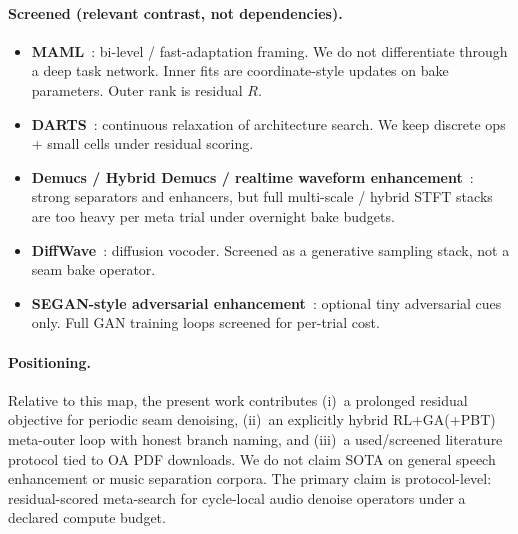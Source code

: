 \paragraph{Screened (relevant contrast, not dependencies).}
\begin{itemize}
  \item \textbf{MAML}~\cite{finn2017}: bi-level / fast-adaptation framing. We do not differentiate through a deep task network. Inner fits are coordinate-style updates on bake parameters. Outer rank is residual $R$.
  \item \textbf{DARTS}~\cite{liu2019}: continuous relaxation of architecture search. We keep discrete ops + small cells under residual scoring.
  \item \textbf{Demucs / Hybrid Demucs / realtime waveform enhancement}~\cite{dfossez2019,dfossez2021,dfossez2020}: strong separators and enhancers, but full multi-scale / hybrid STFT stacks are too heavy per meta trial under overnight bake budgets.
  \item \textbf{DiffWave}~\cite{kong2021}: diffusion vocoder. Screened as a generative sampling stack, not a seam bake operator.
  \item \textbf{SEGAN-style adversarial enhancement}~\cite{pascual2017}: optional tiny adversarial cues only. Full GAN training loops screened for per-trial cost.
\end{itemize}

\paragraph{Positioning.}
Relative to this map, the present work contributes (i)~a prolonged residual objective for periodic seam denoising, (ii)~an explicitly hybrid RL+GA(+PBT) meta-outer loop with honest branch naming, and (iii)~a used/screened literature protocol tied to OA PDF downloads.
We do not claim SOTA on general speech enhancement or music separation corpora.
The primary claim is protocol-level: residual-scored meta-search for cycle-local audio denoise operators under a declared compute budget.
